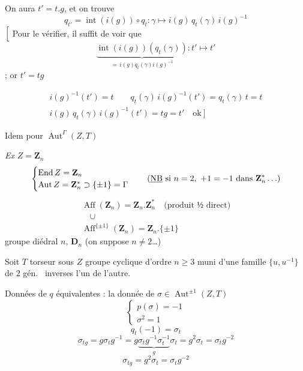 \documentclass[11pt,a4paper]{article}
\begin{document}
On aura $t' = t.g$, et on trouve
\[
  q_{t'} = \operatorname{int}(i(g)) \circ q_t : \gamma \mapsto
  i(g)\, q_t(\gamma)\, i(g)^{-1}
\]
$\Bigl[$ Pour le vérifier, il suffit de voir que
\[
  \underbrace{\operatorname{int}(i(g))(q_t(\gamma))}_{=\, i(g) q_t(\gamma) i(g)^{-1}}
  : t' \mapsto t'
\]
; or $t' = tg$


\begin{gather*}
  i(g)^{-1}(t') = t \qquad q_t(\gamma)\, i(g)^{-1}(t') = q_t(\gamma)\, t = t \\
  i(g)\, q_t(\gamma)\, i(g)^{-1}(t') = tg = t' \quad \text{ok} \ \Bigr]
\end{gather*}

Idem pour $\operatorname{Aut}^{\Gamma}(Z, T)$

\emph{Ex} $Z = \mathbf{Z}_n$
\[
  \begin{cases}
    \operatorname{End} Z = \mathbf{Z}_n \\
    \operatorname{Aut} Z = \mathbf{Z}_n^{*} \supset \{\pm 1\} = \Gamma
  \end{cases}
  \quad (\text{\underline{NB} si } n = 2,\ +1 = -1 \text{ dans } \mathbf{Z}_n^{*} \ldots)
\]
\struck{\ill{}}
\[
  \begin{array}{l}
    \operatorname{Aff}(\mathbf{Z}_n) = \mathbf{Z}_n . \mathbf{Z}_n^{*}
      \quad \text{(produit ½ direct)} \\
    \quad \cup \\
    \operatorname{Aff}^{\{\pm 1\}}(\mathbf{Z}_n) = \mathbf{Z}_n . \{\pm 1\}
  \end{array}
\]
groupe diédral  $n$, $\mathbf{D}_n$ (on suppose
$n \neq 2$…)

Soit $T$ torseur sous $Z$ groupe cyclique d'ordre $n \geq 3$ muni d'une
famille $\{u, u^{-1}\}$ de $2$ gén.\  inverses l'un de
l'autre.


Données de $q$ équivalentes : la donnée de
$\sigma \in \operatorname{Aut}^{\pm 1}(Z, T)$
\[
  \begin{cases}
    p(\sigma) = -1 \\
    \sigma^2 = 1
  \end{cases}
\]
\[
  q_t(-1) = \sigma_t
\]
\[
  \sigma_{tg} = g \sigma_t g^{-1} = g \underbrace{\sigma_t g^{-1} \sigma_t^{-1}}_{g}
  \sigma_t = g^2 \sigma_t = \sigma_t g^{-2}
\]
\[
  \boxed{\sigma_{tg} = g^2 \sigma_t = \sigma_t g^{-2}}
\]
\end{document}
